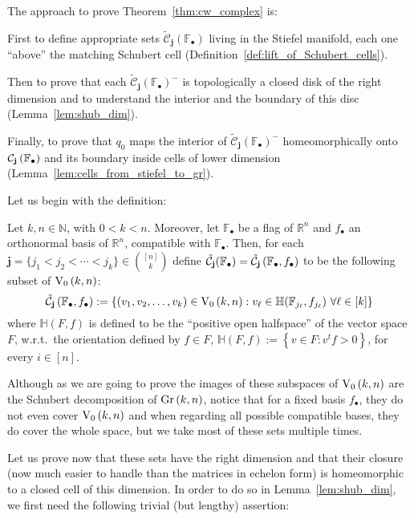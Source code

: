 The approach to prove Theorem~\ref{thm:cw_complex} is:
\begin{i_enum}
\item First to define appropriate sets $\tilde{\mathcal{C}}_{\mathbf{j}}(\mathbb{F}_{\bullet})$ living in the Stiefel manifold, each one ``above'' the matching Schubert cell (Definition~\ref{def:lift_of_Schubert_cells}).
\item Then to prove that each $\tilde{\mathcal{C}}_{\mathbf{j}}{\left(\mathbb{F}_{\bullet}\right)}^-$ is topologically a closed disk of the right dimension and to understand the interior and the boundary of this disc (Lemma~\ref{lem:shub_dim}).
\item Finally, to prove that $q_0$ maps the interior of $\tilde{\mathcal{C}}_{\mathbf{j}}(\mathbb{F}_{\bullet})^-$ homeomorphically onto $\mathcal{C}_{\mathbf{j}}\left(\mathbb{F}_{\bullet}\right)$ and its boundary inside cells of lower dimension (Lemma~\ref{lem:cells_from_stiefel_to_gr}).
\end{i_enum}
Let us begin with the definition:

\begin{definition}\label{def:lift_of_Schubert_cells} Let $k,n\in\mathbb{N}$, with $0<k<n$. Moreover, let $\mathbb{F}_{\bullet}$ be a flag of $\mathbb{R}^n$ and $f_{\bullet}$ an orthonormal basis of $\mathbb{R}^n$, compatible with $\mathbb{F}_{\bullet}$. Then, for each $\mathbf{j}=\{j_1<j_2<\cdots<j_k\}\in\binom{[n]}{k}$ define $\tilde{\mathcal{C}}_{\mathbf{j}}(\mathbb{F}_{\bullet})=\tilde{\mathcal{C}}_{\mathbf{j}}\left(\mathbb{F}_{\bullet},f_{\bullet}\right)$ to be the following subset of $\StO{k}{n}$:
\[\stcell{j}:=\left\{(v_1,v_2,\ldots,v_k)\in\StO{k}{n}:v_{\ell}\in\mathbb{H}(\mathbb{F}_{j_{\ell}},f_{j_{\ell}})\ \forall\ell\in[k]\right\}\]
where $\mathbb{H}(F,f)$ is defined to be the ``positive open halfspace'' of the vector space $F$, w.r.t.\ the orientation defined by $f\in F$,
$\mathbb{H}(F,f):=\left\{v\in F:v^tf>0\right\}$,
for every $i\in[n]$.
\end{definition}

Although as we are going to prove the images of these subspaces of $\StO{k}{n}$ are the Schubert decomposition of $\Gr{k}{n}$, notice that for a fixed basis $f_{\bullet}$, they do not even cover $\StO{k}{n}$ and when regarding all possible compatible bases, they do cover the whole space, but we take most of these sets multiple times.

Let us prove now that these sets have the right dimension and that their closure (now much easier to handle than the matrices in echelon form) is homeomorphic to a closed cell of this dimension. In order to do so in Lemma~\ref{lem:shub_dim}, we first need the following trivial (but lengthy) assertion:

